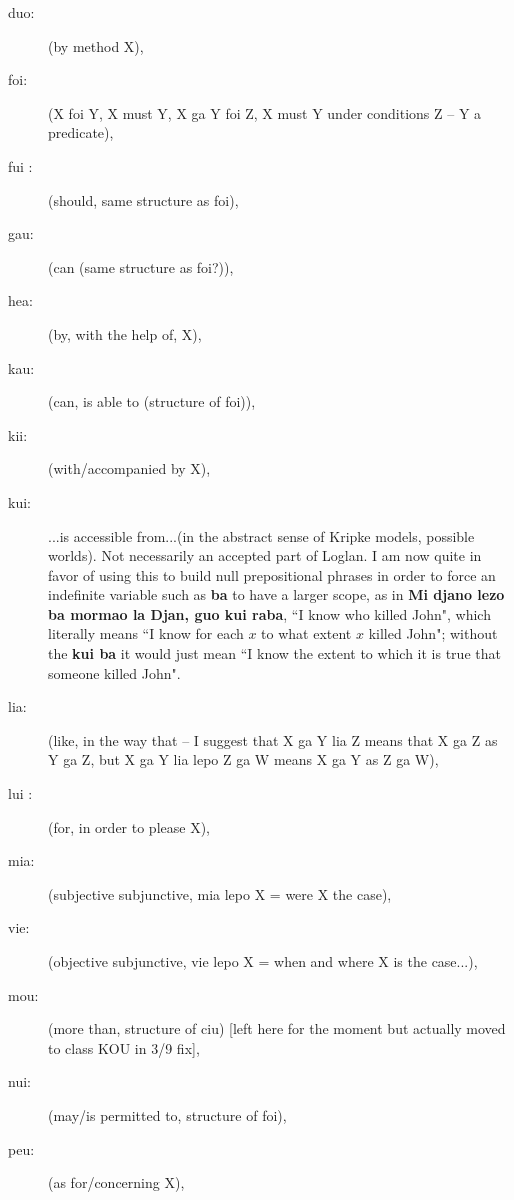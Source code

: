 \documentclass[12pt]{book}
\begin{document}
\begin{description}
\item[duo:]  (by method X), 

\item[foi:]   (X foi Y, X must Y, X ga Y foi Z, X must Y under conditions Z  -- Y a predicate), 

\item[fui :]  (should, same structure as foi), 

\item[gau:] (can (same structure as foi?)), 

\item[hea:]  (by, with the help of, X), 

\item[kau:] (can, is able to (structure of foi)), 

\item[kii:]  (with/accompanied by X), 

\item[kui:] ...is accessible from...(in the abstract sense of Kripke models, possible worlds).  Not necessarily an accepted part of Loglan.  I am now quite in favor of using this to build null prepositional phrases in order to force an indefinite variable such as {\bf ba} to have a larger scope, as in
{\bf Mi djano lezo ba mormao la Djan, guo kui raba}, ``I know who killed John", which literally means ``I know for each $x$ to what extent $x$ killed John"; without the {\bf kui ba} it would just mean ``I know the extent to which it is true that someone killed John".

\item[lia:]   (like, in the way that  -- I suggest that X ga Y lia Z means that X ga Z as Y ga Z, but X ga Y lia lepo Z ga W means X ga Y as Z ga W), 

\item[lui :] (for, in order to please X), 

\item[mia:]   (subjective subjunctive, mia lepo X = were X the case), 

\item[vie:]  (objective subjunctive, vie lepo X = when and where X is the case...),

\item[mou:]  (more than, structure of ciu) [left here for the moment but actually moved to class KOU in 3/9 fix],

\item[nui:]   (may/is permitted to, structure of foi), 

\item[peu:]  (as for/concerning X), 


\end{description}
\end{document}
